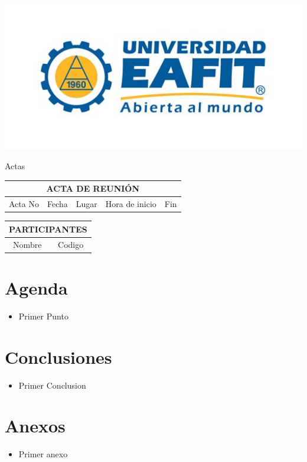 \documentclass{article}
\begin{document}
    \begin{minipage}{0.4\textwidth}
        \includegraphics[scale=1]{Logo}
    \end{minipage}

    \begin{center}
        \begin{huge}
            Actas
        \end{huge}
    \end{center}

    \vspace{1cm}

    \begin{tabular}{ | c | c | c | c | c | }
        \hline
        \multicolumn{5}{|c|}{\cellcolor{gray} ACTA DE REUNI\'ON} \\
        \hline
        Acta No & Fecha & Lugar & Hora de inicio & Fin \\
        \hline
    \end{tabular}

    \vspace{1cm}

    \begin{tabular}{ | c | c | }
        \hline
        \multicolumn{2}{|c|}{\cellcolor{gray} PARTICIPANTES} \\
        \hline
        Nombre & Codigo \\
        \hline
    \end{tabular}

    \vspace{1cm}

    \section*{Agenda}

    \begin{itemize}
        \item Primer Punto
    \end{itemize}

    \section*{Conclusiones}

    \begin{itemize}
        \item Primer Conclusion
    \end{itemize}

    \section*{Anexos}

    \begin{itemize}
        \item Primer anexo
    \end{itemize}
\end{document}

